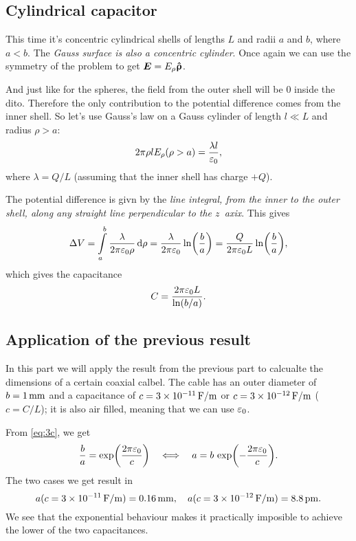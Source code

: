 \documentclass[11pt,letter, swedish, english
]{article}
\let\oldint\int
\renewcommand{\int}{\oldint\limits}
\newcommand{\enaught}{\ensuremath\varepsilon_0}
\begin{document}
\subsection{Cylindrical capacitor}
This time it's concentric cylindrical shells of lengths $L$ and radii
$a$ and $b$, where $a<b$. The \textit{Gauss surface is also a
  concentric cylinder}. Once again we can use the symmetry of the
problem to get $\vb*E=E_\rho\vu*\uprho$.

And just like for the spheres, the field from the outer shell will be
$0$ inside the dito. Therefore the only contribution to the potential
difference comes from the inner shell. So let's use Gauss's law on a
Gauss cylinder of length $l\ll L$ and radius $\rho>a$:
\begin{equation}
2\pi\rho l E_\rho(\rho>a)=\frac{\lambda l}{\enaught},
\end{equation}
where $\lambda=Q/L$ (assuming that the inner shell has charge $+Q$).

The potential difference is givn by the \textit{line integral, from the
inner to the outer shell, along any straight line perpendicular to the
$z$~axix}. This gives
\begin{equation}
\Delta{V}=\int_a^b\frac{\lambda}{2\pi\enaught \rho}\id\rho
=\frac{\lambda}{2\pi\enaught}\ln(\frac{b}{a})
=\frac{Q}{2\pi\enaught L}\ln(\frac{b}{a}),
\end{equation}
which gives the capacitance
\begin{equation}\label{eq:3c}
C=\frac{2\pi\enaught L}{\ln(b/a)}.
\end{equation}


\subsection{Application of the previous result}
In this part we will apply the result from the previous part to
calcualte the dimensions of a certain coaxial calbel. The cable has an
outer diameter of $b=\unit[1]{mm}$ and a capacitance of
$c=\unit[3\times10^{-11}]{F/m}$ or $c=\unit[3\times10^{-12}]{F/m}$
($c=C/L$); it is also air filled, meaning that we can use $\enaught$.

From \eqref{eq:3c}, we get
\begin{equation}
\frac{b}{a}=\exp(\frac{2\pi\enaught}{c})
\quad\Longleftrightarrow\quad
a=b\,\exp(-\frac{2\pi\enaught}{c}).
\end{equation}
The two cases we get result in
\begin{equation}
a(c=\unit[3\times10^{-11}]{F/m})=\unit[0.16]{mm}\qcomma
a(c=\unit[3\times10^{-12}]{F/m})=\unit[8.8]{pm}.
\end{equation}
We see that the exponential behaviour makes it practically imposible
to achieve the lower of the two capacitances. 
\end{document}
